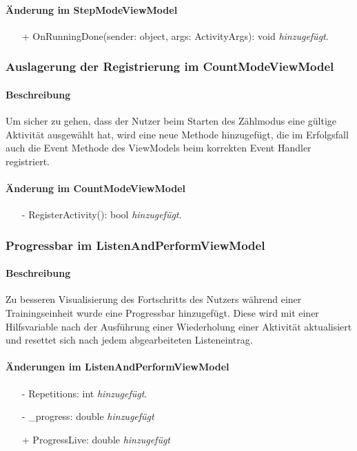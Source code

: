 \documentclass[a4paper,12pt]{article}
\begin{document}
\paragraph{Änderung im StepModeViewModel}
\begin{itemize}
	\item[+]  OnRunningDone(sender: object, args: ActivityArgs): void \textit{hinzugefügt}.
\end{itemize}

\subsubsection{Auslagerung der Registrierung im CountModeViewModel}
\paragraph{Beschreibung}
Um sicher zu gehen, dass der Nutzer beim Starten des Zählmodus eine gültige Aktivität ausgewählt hat, wird eine neue Methode hinzugefügt, die im Erfolgsfall auch die Event Methode des ViewModels beim korrekten Event Handler registriert.
\paragraph{Änderung im CountModeViewModel}
\begin{itemize}
	\item[-]  RegisterActivity(): bool \textit{hinzugefügt}.
\end{itemize}

\subsubsection{Progressbar im ListenAndPerformViewModel}
\paragraph{Beschreibung}
Zu besseren Visualisierung des Fortschritts des Nutzers während einer Trainingseinheit wurde eine Progressbar hinzugefügt. Diese wird mit einer Hilfsvariable nach der Ausführung einer Wiederholung einer Aktivität aktualisiert und resettet sich nach jedem abgearbeiteten Listeneintrag.
\paragraph{Änderungen im ListenAndPerformViewModel }
\begin{itemize}
	\item[-] Repetitions: int \textit{hinzugefügt}.
	\item[-] \_progress: double \textit{hinzugefügt}
	\item[+] ProgressLive: double \textit{hinzugefügt}
\end{itemize}
\end{document}
